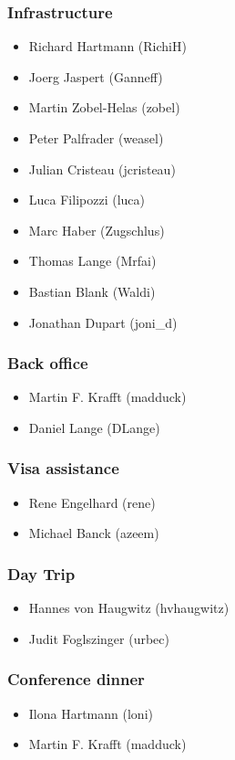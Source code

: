 \documentclass[t]{beamer}
\begin{document}
\begin{frame}
	\frametitle{Infrastructure}
	\begin{itemize}
		\item Richard Hartmann (RichiH)
		\item Joerg Jaspert (Ganneff)
		\item Martin Zobel-Helas (zobel)
		\item Peter Palfrader (weasel)
		\item Julian Cristeau (jcristeau)
		\item Luca Filipozzi (luca)
		\item Marc Haber (Zugschlus)
		\item Thomas Lange (Mrfai)
		\item Bastian Blank (Waldi)
		\item Jonathan Dupart (joni\_d)
	\end{itemize}
\end{frame}

\begin{frame}
	\frametitle{Back office}
	\begin{itemize}
		\item Martin F. Krafft (madduck)
		\item Daniel Lange (DLange)
	\end{itemize}
\end{frame}

\begin{frame}
	\frametitle{Visa assistance}
	\begin{itemize}
		\item Rene Engelhard (rene)
		\item Michael Banck (azeem)
	\end{itemize}
\end{frame}

\begin{frame}
	\frametitle{Day Trip}
	\begin{itemize}
		\item Hannes von Haugwitz (hvhaugwitz)
		\item Judit Foglszinger (urbec)
	\end{itemize}
\end{frame}

\begin{frame}
	\frametitle{Conference dinner}
	\begin{itemize}
		\item Ilona Hartmann (loni)
		\item Martin F. Krafft (madduck)
	\end{itemize}
\end{frame}
\end{document}
